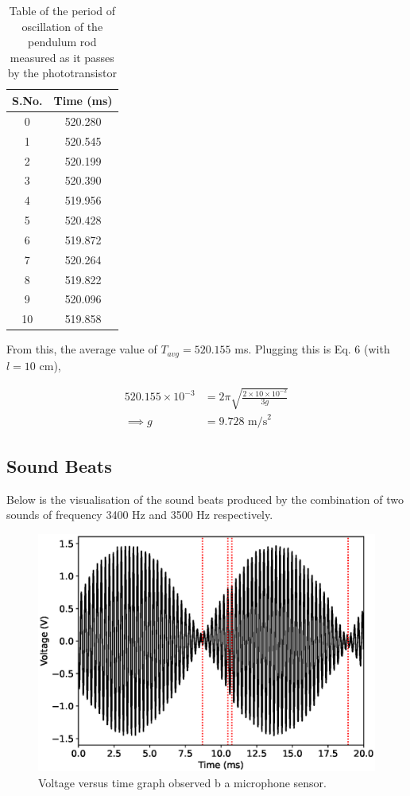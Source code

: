 \begin{table}[H]
    \centering
    \begin{tabular}{|c|c|}\hline
    S.No. & Time (ms) \\ \hline
    0 & 520.280 \\
    1 & 520.545 \\
    2 & 520.199 \\
    3 & 520.390 \\
    4 & 519.956 \\
    5 & 520.428 \\
    6 & 519.872 \\
    7 & 520.264 \\
    8 & 519.822 \\
    9 & 520.096 \\
    10 & 519.858 \\\hline
    \end{tabular}
    \caption{Table of the period of oscillation of the pendulum rod measured as it passes by the phototransistor}
\end{table}

From this, the average value of $T_{avg} = 520.155$ ms. Plugging this is Eq. 6 (with $l=10$ cm),

\begin{align*}
    520.155 \times 10^{-3} &= 2\pi \sqrt{\frac{2\times 10 \times 10^{-2}}{3g}}\\
    \implies g &= 9.728 \text{ m/s}^2
\end{align*}

\subsection{Sound Beats}

Below is the visualisation of the sound beats produced by the combination of two sounds of frequency 3400 Hz and 3500 Hz respectively.

\begin{figure}
    \centering
    \includegraphics[width=1\columnwidth]{images/beat.eps}
    \caption{Voltage versus time graph observed b a microphone sensor.}
\end{figure}

